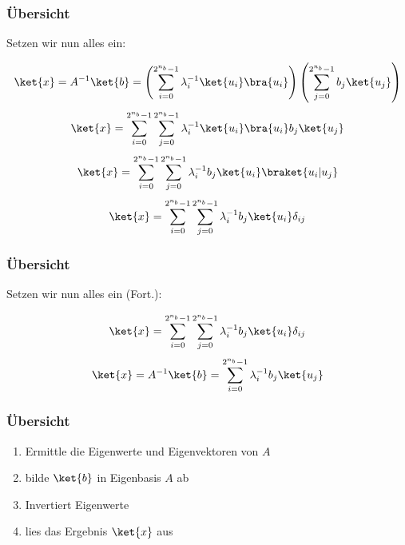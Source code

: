 \begin{frame}
    \frametitle{Übersicht}

        Setzen wir nun alles ein:

        \hfil
        $$\ket{x} = A^{-1} \ket{b} = \left( \sum_{i=0}^{2^{n_b}-1} \lambda_i^{-1} \ket{u_i}\bra{u_i} \right) \left( \sum_{j=0}^{2^{n_b}-1} b_j\ket{u_j} \right)$$
        $$\ket{x}= \sum_{i=0}^{2^{n_b}-1} \sum_{j=0}^{2^{n_b}-1} \lambda_i^{-1} \ket{u_i}\bra{u_i} b_j\ket{u_j}$$
        $$\ket{x}= \sum_{i=0}^{2^{n_b}-1} \sum_{j=0}^{2^{n_b}-1} \lambda_i^{-1} b_j\ket{u_i}\braket{u_i| u_j}$$
        $$\ket{x} = \sum_{i=0}^{2^{n_b}-1} \sum_{j=0}^{2^{n_b}-1} \lambda_i^{-1} b_j\ket{u_i}\delta_{ij}$$

    \end{frame}


    \begin{frame}
    \frametitle{Übersicht}
        Setzen wir nun alles ein (Fort.):

        \hfil
        $$\ket{x} = \sum_{i=0}^{2^{n_b}-1} \sum_{j=0}^{2^{n_b}-1} \lambda_i^{-1} b_j\ket{u_i}\delta_{ij}$$
        $$\ket{x} =  A^{-1} \ket{b} = \sum_{i=0}^{2^{n_b}-1} \lambda_i^{-1} b_j\ket{u_j}$$

    \end{frame}

\begin{frame}
    \frametitle{Übersicht}
        \begin{enumerate}
            \item Ermittle die Eigenwerte und Eigenvektoren von $A$
            \item bilde $\ket{b}$ in Eigenbasis $A$ ab
            \item  Invertiert Eigenwerte
            \item lies das Ergebnis $\ket{x}$ aus
        \end{enumerate}
\end{frame}



